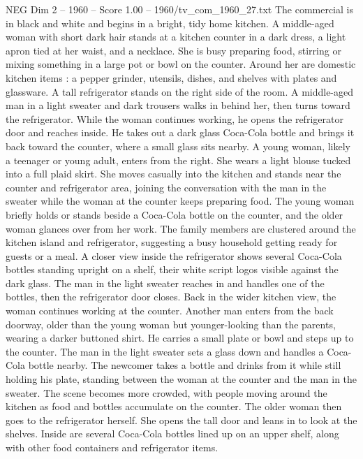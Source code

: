 \begin{textsample}{NEG Dim 2 – 1960 – Score 1.00 – 1960/tv\_com\_1960\_27.txt}  \label{ex:f2_neg_083}
The commercial is in black and white and begins in a bright, tidy home kitchen.
A middle-aged woman with short dark hair stands at a kitchen counter in a dark dress, a light apron tied at her waist, and a necklace.
She is busy preparing food, stirring or mixing something in a large pot or bowl on the counter.
Around her are domestic kitchen items : a pepper grinder, utensils, dishes, and shelves with plates and glassware.
A tall refrigerator stands on the right side of the room.
A middle-aged man in a light sweater and dark trousers walks in behind her, then turns toward the refrigerator.
While the woman continues working, he opens the refrigerator door and reaches inside.
He takes out a dark glass Coca-Cola bottle and brings it back toward the counter, where a small glass sits nearby.
A young woman, likely a teenager or young adult, enters from the right.
She wears a light blouse tucked into a full plaid skirt.
She moves casually into the kitchen and stands near the counter and refrigerator area, joining the conversation with the man in the sweater while the woman at the counter keeps preparing food.
The young woman briefly holds or stands beside a Coca-Cola bottle on the counter, and the older woman glances over from her work.
The family members are clustered around the kitchen island and refrigerator, suggesting a busy household getting ready for guests or a meal.
A closer view inside the refrigerator shows several Coca-Cola bottles standing upright on a shelf, their white script logos visible against the dark glass.
The man in the light sweater reaches in and handles one of the bottles, then the refrigerator door closes.
Back in the wider kitchen view, the woman continues working at the counter.
Another man enters from the back doorway, older than the young woman but younger-looking than the parents, wearing a darker buttoned shirt.
He carries a small plate or bowl and steps up to the counter.
The man in the light sweater sets a glass down and handles a Coca-Cola bottle nearby.
The newcomer takes a bottle and drinks from it while still holding his plate, standing between the woman at the counter and the man in the sweater.
The scene becomes more crowded, with people moving around the kitchen as food and bottles accumulate on the counter.
The older woman then goes to the refrigerator herself.
She opens the tall door and leans in to look at the shelves.
Inside are several Coca-Cola bottles lined up on an upper shelf, along with other food containers and refrigerator items.

\end{textsample}
